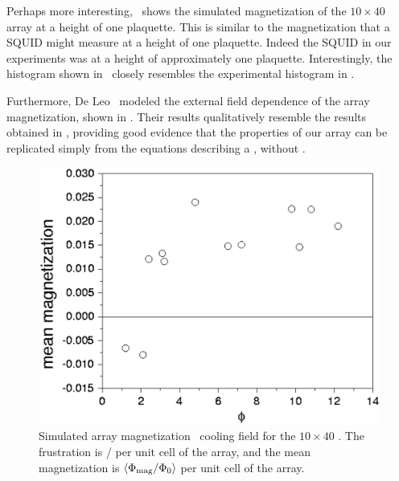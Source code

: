 Perhaps more interesting,
\  shows the simulated
magnetization of the $10 \times 40 $ array at a height of one 
plaquette. This is similar to the magnetization that a SQUID might
measure at a height of one plaquette. Indeed the SQUID in our 
experiments was at a height of approximately one plaquette. 
Interestingly, the histogram shown in \
closely resembles the experimental histogram in 
.

Furthermore, De Leo \etal\ modeled the external field dependence of the 
array magnetization, shown in \FigRef{fig:sim_array_mag}. Their results
qualitatively resemble the results obtained in ,
providing good evidence that the properties of our array can be replicated
simply from the equations describing a \jja, without \pijunctions. 

%
%
\begin{figure}
\includegraphics[width=5.7in]{figs/pme_theory/fig47.ps}
\caption[Simulated array magnetization \vs\ cooling field.]
{Simulated array magnetization \vs\ cooling field for the 
$10\times 40 $ \jja. The frustration is {\Phiext/\Phinot} per
unit cell of the array, and the mean magnetization is 
$\langle \Phi_{\mathrm{mag}} / \Phi_0 \rangle$ per unit cell of the array.}
\label{fig:sim_array_mag}
\end{figure}
